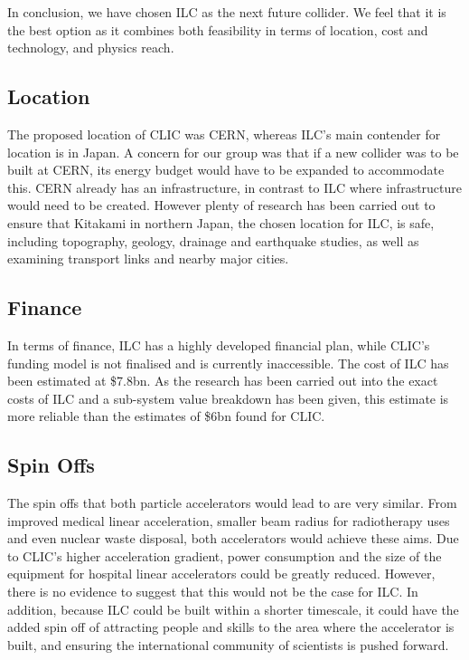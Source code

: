 In conclusion, we have chosen ILC as the next future collider. We feel that it is the best option as it combines both feasibility in terms of location, cost and technology, and physics reach.

\subsection{Location}

The proposed location of CLIC was CERN, whereas ILC’s main contender for location is in Japan. A concern for our group was that if a new collider was to be built at CERN, its energy budget would have to be expanded to accommodate this. CERN already has an infrastructure, in contrast to ILC where infrastructure would need to be created. However plenty of research has been carried out to ensure that Kitakami in northern Japan, the chosen location for ILC, is safe, including topography, geology, drainage and earthquake studies, as well as examining transport links and nearby major cities.

\subsection{Finance}

In terms of finance, ILC has a highly developed financial plan, while CLIC’s funding model is not finalised and is currently inaccessible. The cost of ILC has been estimated at \$7.8bn. As the research has been carried out into the exact costs of ILC and a sub-system value breakdown has been given, this estimate is more reliable than the estimates of \$6bn found for CLIC.

\subsection{Spin Offs}

The spin offs that both particle accelerators would lead to are very similar. From improved medical linear acceleration, smaller beam radius for radiotherapy uses and even nuclear waste disposal, both accelerators would achieve these aims. Due to CLIC’s higher acceleration gradient, power consumption and the size of the equipment for hospital linear accelerators could be greatly reduced. However, there is no evidence to suggest that this would not be the case for ILC. In addition, because ILC could be built within a shorter timescale, it could have the added spin off of attracting people and skills to the area where the accelerator is built, and ensuring the international community of scientists is pushed forward.


